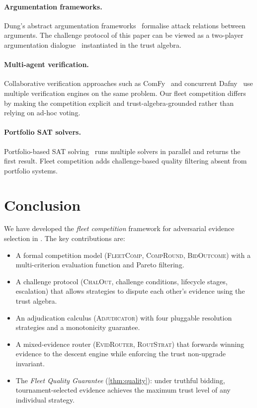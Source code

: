 \documentclass[11pt]{article}
\providecommand{\FleetComp}{\textsc{FleetComp}}   %
\providecommand{\CompRound}{\textsc{CompRound}}   %
\providecommand{\BidOut}{\textsc{BidOutcome}}     %
\providecommand{\ChalOut}{\textsc{ChalOut}}       %
\providecommand{\EvidRouter}{\textsc{EvidRouter}} %
\providecommand{\RoutStrat}{\textsc{RoutStrat}}   %
\begin{document}
\paragraph{Argumentation frameworks.}
Dung's abstract argumentation frameworks~\cite{Dung95} formalise attack
relations between arguments.  The challenge protocol of this paper can be
viewed as a two-player argumentation dialogue~\cite{Walton95} instantiated
in the \JuGeo{} trust algebra.

\paragraph{Multi-agent verification.}
Collaborative verification approaches such as ComFy~\cite{ComFy14} and
concurrent Dafny~\cite{ConcDafny17} use multiple verification engines on the
same problem.  Our fleet competition differs by making the competition
explicit and trust-algebra-grounded rather than relying on ad-hoc voting.

\paragraph{Portfolio SAT solvers.}
Portfolio-based SAT solving~\cite{Xu08} runs multiple solvers in parallel and
returns the first result.  Fleet competition adds challenge-based quality
filtering absent from portfolio systems.

\section{Conclusion}\label{sec:conclusion}

We have developed the \emph{fleet competition} framework for adversarial
evidence selection in \JuGeo{}.  The key contributions are:

\begin{itemize}
  \item A formal competition model (\FleetComp{}, \CompRound{}, \BidOut{}) with
    a multi-criterion evaluation function and Pareto filtering.
  \item A challenge protocol (\ChalOut{}, challenge conditions, lifecycle
    stages, escalation) that allows strategies to dispute each other's
    evidence using the trust algebra.
  \item An adjudication calculus (\textsc{Adjudicator}) with four pluggable
    resolution strategies and a monotonicity guarantee.
  \item A mixed-evidence router (\EvidRouter{}, \RoutStrat{}) that forwards
    winning evidence to the descent engine while enforcing the
    trust non-upgrade invariant.
  \item The \emph{Fleet Quality Guarantee} (\cref{thm:quality}): under
    truthful bidding, tournament-selected evidence achieves the maximum trust
    level of any individual strategy.
\end{itemize}
\end{document}
